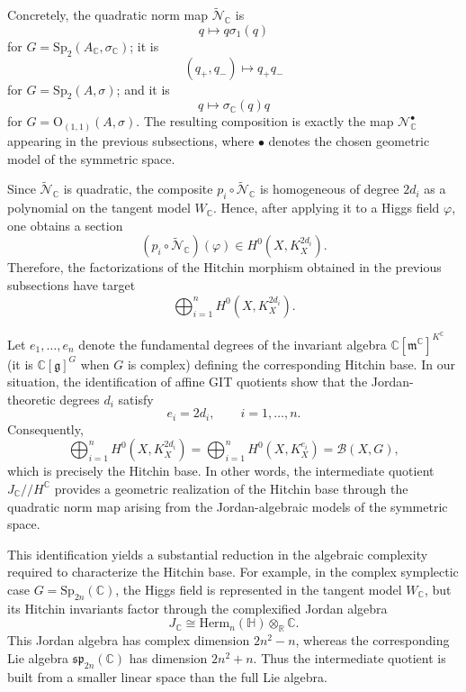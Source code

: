 \documentclass[oneside,11pt]{amsart}
\theoremstyle{definition}
\theoremstyle{remark}
\numberwithin{thm}{section}
\numberwithin{equation}{section}
\begin{document}
Concretely, the quadratic norm map $\tilde{\mathcal{N}}_{\mathbb{C}}$ is
\[
q\longmapsto q\sigma_1(q)
\]
for $G=\mathrm{Sp}_2(A_{\mathbb C},\sigma_{\mathbb C})$; it is
\[
(q_+,q_-)\longmapsto q_+q_-
\]
for $G=\mathrm{Sp}_2(A,\sigma)$; and it is
\[
q\longmapsto \sigma_{\mathbb C}(q)q
\]
for $G=\mathrm{O}_{(1,1)}(A,\sigma)$. The resulting composition is exactly the map $\mathcal{N}_{\mathbb{C}}^{\bullet}$ appearing in the previous subsections, where $\bullet$ denotes the chosen geometric model of the symmetric space.

Since $\tilde{\mathcal{N}}_{\mathbb{C}}$ is quadratic, the composite $p_i\circ \tilde{\mathcal{N}}_{\mathbb{C}}$ is homogeneous of degree $2d_i$ as a polynomial on the tangent model $W_{\mathbb{C}}$. Hence, after applying it to a Higgs field $\varphi$, one obtains a
section
\[
(p_i\circ \tilde{\mathcal{N}}_{\mathbb{C}})(\varphi)\in H^0(X,K_X^{2d_i}).
\]
Therefore, the factorizations of the Hitchin morphism obtained in the previous subsections have target
\[
\bigoplus_{i=1}^{n} H^0(X,K_X^{2d_i}).
\]

Let $e_1,\dots,e_n$ denote the fundamental degrees of the invariant algebra $\mathbb{C}[\mathfrak{m}^{\mathbb C}]^{K^{\mathbb C}}$ (it is $\mathbb{C}[\mathfrak g]^{G}$ when $G$ is complex) defining the corresponding Hitchin base. In our situation, the identification of affine GIT quotients show that the Jordan-theoretic degrees $d_i$ satisfy
\[
e_i=2d_i,\qquad i=1,\dots,n.
\]
Consequently,
\[
\bigoplus_{i=1}^{n} H^0(X,K_X^{2d_i}) = \bigoplus_{i=1}^{n} H^0(X,K_X^{e_i}) = \mathcal B(X,G),
\]
which is precisely the Hitchin base. In other words, the intermediate quotient $J_{\mathbb{C}}/\!\!/{H^{\mathbb C}}$
provides a geometric realization of the Hitchin base through the quadratic norm map arising from the Jordan-algebraic models of the symmetric space.

This identification yields a substantial reduction in the algebraic complexity required to characterize the Hitchin base. For example, in the complex symplectic case $G=\mathrm{Sp}_{2n}(\mathbb{C})$, the Higgs field is represented in the tangent model $W_{\mathbb C}$, but its Hitchin invariants factor through the complexified Jordan algebra
\[
J_{\mathbb C}\cong\mathrm{Herm}_n(\mathbb H)\otimes_{\mathbb{R}}\mathbb{C}.
\]
This Jordan algebra has complex dimension $2n^2-n$, whereas the corresponding Lie algebra $\mathfrak{sp}_{2n}(\mathbb{C})$ has dimension $2n^2+n$. Thus the intermediate quotient is built from a smaller linear space than the full Lie algebra. 
\end{document}
